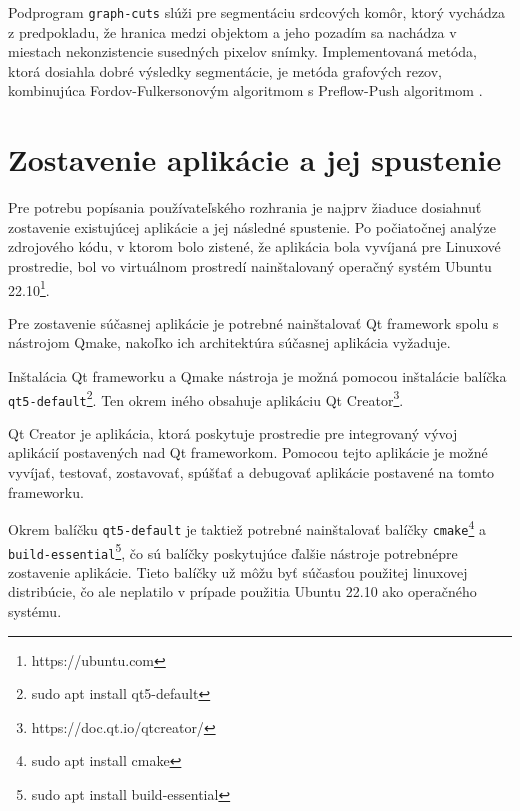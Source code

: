 Podprogram \texttt{graph-cuts} slúži pre segmentáciu srdcových komôr, ktorý vychádza z predpokladu, že hranica medzi objektom a jeho pozadím sa nachádza v miestach nekonzistencie susedných pixelov snímky. Implementovaná metóda, ktorá dosiahla dobré výsledky segmentácie, je metóda grafových rezov, kombinujúca Fordov-Fulkersonovým algoritmom s Preflow-Push algoritmom \cite{master_thesis_app}.

\section {Zostavenie aplikácie a jej spustenie}
Pre potrebu popísania používateľského rozhrania je najprv žiaduce dosiahnuť zostavenie existujúcej aplikácie a jej následné spustenie. Po počiatočnej analýze zdrojového kódu, v ktorom bolo zistené, že aplikácia bola vyvíjaná pre Linuxové prostredie, bol vo virtuálnom prostredí nainštalovaný operačný systém Ubuntu 22.10\footnote{https://ubuntu.com}.

Pre zostavenie súčasnej aplikácie je potrebné nainštalovať Qt framework spolu s nástrojom Qmake, nakoľko ich architektúra súčasnej aplikácia vyžaduje.

Inštalácia Qt frameworku a Qmake nástroja je možná pomocou inštalácie balíčka \texttt{qt5-default}\footnote{sudo apt install qt5-default}. Ten okrem iného obsahuje aplikáciu Qt Creator\footnote{https://doc.qt.io/qtcreator/}.

Qt Creator je aplikácia, ktorá poskytuje prostredie pre integrovaný vývoj aplikácií postavených nad Qt frameworkom. Pomocou tejto aplikácie je možné vyvíjať, testovať, zostavovať, spúšťať a debugovať aplikácie postavené na tomto frameworku.

Okrem balíčku \texttt{qt5-default} je taktiež potrebné nainštalovať balíčky \texttt{cmake}\footnote{sudo apt install cmake} a \texttt{build-essential}\footnote{sudo apt install build-essential}, čo sú balíčky poskytujúce ďalšie nástroje potrebné\newline pre zostavenie aplikácie. Tieto balíčky už môžu byť súčasťou použitej linuxovej distribúcie, čo ale neplatilo v prípade použitia Ubuntu 22.10 ako operačného systému.

